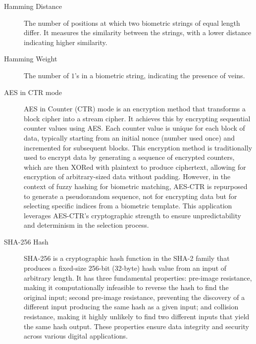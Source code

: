 \begin{description}
    \item[Hamming Distance] \label{def:Hamming Distance} The number of positions at which two biometric strings of equal length differ. It measures the similarity between the strings, with a lower distance indicating higher similarity.

    \item[Hamming Weight] \label{def:Hamming Weight} The number of \(1\)'s in a biometric string, indicating the presence of veins.

    \item[AES in CTR mode] \label{def:AES CTR mode} AES in Counter (CTR) mode is an encryption method that transforms a block cipher into a stream cipher. It achieves this by encrypting sequential counter values using AES. Each counter value is unique for each block of data, typically starting from an initial nonce (number used once) and incremented for subsequent blocks. This encryption method is traditionally used to encrypt data by generating a sequence of encrypted counters, which are then XORed with plaintext to produce ciphertext, allowing for encryption of arbitrary-sized data without padding. However, in the context of fuzzy hashing for biometric matching, AES-CTR is repurposed to generate a pseudorandom sequence, not for encrypting data but for selecting specific indices from a biometric template. This application leverages AES-CTR's cryptographic strength to ensure unpredictability and determinism in the selection process.

    \item[SHA-256 Hash] \label{def:SHA-256} SHA-256 is a cryptographic hash function in the SHA-2 family that produces a fixed-size 256-bit (32-byte) hash value from an input of arbitrary length. It has three fundamental properties: pre-image resistance, making it computationally infeasible to reverse the hash to find the original input; second pre-image resistance, preventing the discovery of a different input producing the same hash as a given input; and collision resistance, making it highly unlikely to find two different inputs that yield the same hash output. These properties ensure data integrity and security across various digital applications.

\end{description}
